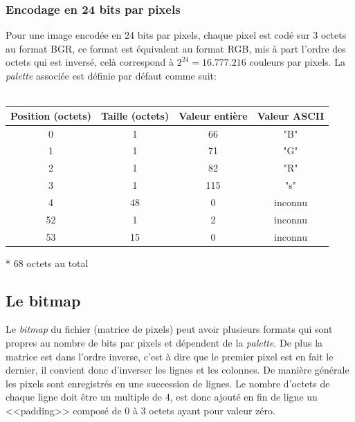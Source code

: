 \documentclass{article}
\begin{document}
	
			\subsubsection{Encodage en 24 bits par pixels}
			Pour une image encodée en 24 bits par pixels, chaque pixel est codé sur 3 octets au format BGR, ce format est équivalent au format RGB, mis à part l'ordre des octets qui est inversé, celà correspond à \begin{math}2^24 = 16.777.216\end{math} couleurs par pixels. La \emph{palette} associée est définie par défaut comme suit:\\\\
			\begin{tabular}{|c|c|c|c|}
				\hline
				\textbf{Position (octets)}&\textbf{Taille (octets)}&\textbf{Valeur entière}&\textbf{Valeur ASCII}\\\hline
				0  & 1  & 66  & "B" \\\hline 
				1  & 1  & 71  & "G" \\\hline 
				2  & 1  & 82  & "R" \\\hline 
				3  & 1  & 115 & "s" \\\hline 
				4  & 48 & 0   & inconnu\\\hline 
				52 & 1  & 2   & inconnu\\\hline 
				53 & 15 & 0   & inconnu \\\hline 
			\end{tabular} * 68 octets au total
		
		
		\subsection{Le bitmap}
	
		Le \emph{bitmap} du fichier (matrice de pixels) peut avoir plusieurs formats qui sont propres au nombre de bits par pixels et dépendent de la \emph{palette}. De plus la matrice est dans l'ordre inverse, c'est à dire que le premier pixel est en fait le dernier, il convient donc d'inverser les lignes et les colonnes. De manière générale les pixels sont enregistrés en une succession de lignes. Le nombre d'octets de chaque ligne doit être un multiple de 4, est donc ajouté en fin de ligne un <<padding>> composé de 0 à 3 octets ayant pour valeur zéro.
	
	
		
\end{document}
